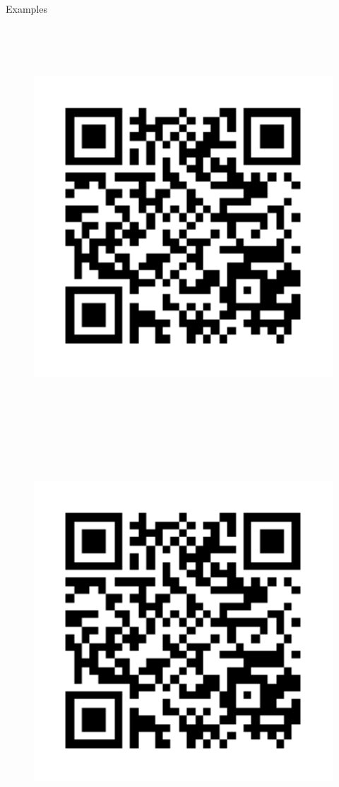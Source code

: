 \begin{block}{Examples}

    \begin{figure}
        \includegraphics[height=15cm, width=30cm]{ref1}
        \includegraphics[height=15cm, width=30cm]{ref1}
    \end{figure}

\end{block}
